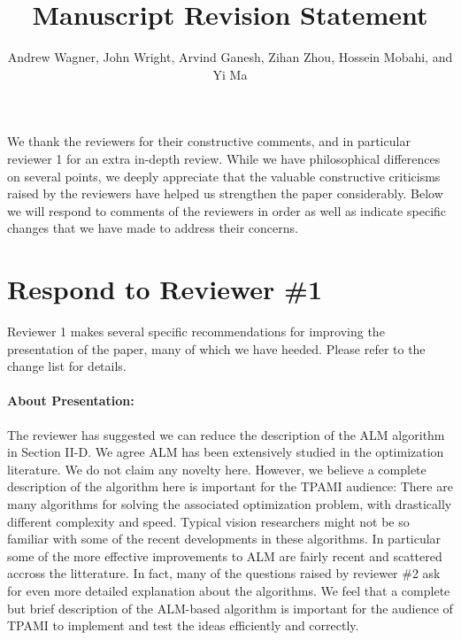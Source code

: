 \documentclass[11pt]{article}
\begin{document}
   

   \title{\Large {\bf Manuscript  Revision Statement}}

       \author{{Andrew Wagner, John Wright, Arvind Ganesh, Zihan Zhou, Hossein Mobahi, and Yi Ma}}

   \date{}
   \maketitle

We thank the reviewers for their constructive comments, and in particular
reviewer 1 for an extra in-depth review.  While we have philosophical
differences on several points, we deeply appreciate that the valuable
constructive criticisms raised by the reviewers have helped us strengthen the
paper considerably.  Below we will respond to comments of the reviewers in
order as well as indicate specific changes that we have made to address their
concerns.

\section{Respond to Reviewer \#1} Reviewer 1 makes several specific
recommendations for improving the presentation of the paper, many of which we
have heeded.  Please refer to the change list for details. 

\paragraph{About Presentation:} The reviewer has suggested we can reduce the
description of the ALM algorithm in Section II-D. We agree ALM has been
extensively studied in the optimization literature. We do not claim any novelty
here. However, we believe a complete description of the algorithm here is
important for the TPAMI audience: There are many algorithms for solving the
associated optimization problem, with drastically different complexity and
speed. Typical vision researchers might not be so familiar with some of the
recent developments in these algorithms. In particular some of the more
effective improvements to ALM are fairly recent and scattered accross the
litterature.  In fact, many of the questions raised by reviewer \#2 ask for
even more detailed explanation about the algorithms. We feel that a complete
but brief description of the ALM-based algorithm is important for the audience
of TPAMI to implement and test the ideas efficiently and correctly.
\end{document}

